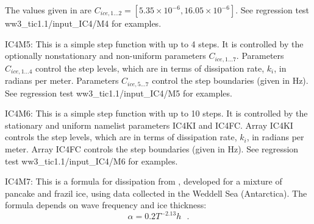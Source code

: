 The values given in \cite{art:Ko14} are ${C_{ice,1...2}}=[5.35\times 10^{-6}, 16.05\times 10^{-6}]$. See regression test {\file ww3\_tic1.1/input\_IC4/M4} for examples.

{\code IC4M5}: This is a simple step function with up to 4 steps. It is controlled by the optionally nonstationary and non-uniform parameters ${C_{ice,1...7}}$. Parameters ${C_{ice,1...4}}$ control the step levels, which are in terms of dissipation rate, ${k_i}$, in radians per meter. Parameters ${C_{ice,5...7}}$ control the step boundaries (given in Hz). See regression test {\file ww3\_tic1.1/input\_IC4/M5} for examples.

{\code IC4M6}: This is a simple step function with up to 10 steps. It is controlled by the stationary and uniform namelist parameters {\code IC4KI} and {\code IC4FC}. Array {\code IC4KI} controls the step levels, which are in terms of dissipation rate, ${k_i}$, in radians per meter. Array {\code IC4FC} controls the step boundaries (given in Hz). See regression test {\file ww3\_tic1.1/input\_IC4/M6} for examples. 

{\code IC4M7}: This is a formula for dissipation from \cite{art:Dob15}, developed for a mixture of pancake and frazil ice, using data collected in the Weddell Sea (Antarctica). The formula depends on wave frequency and ice thickness:
\begin{equation}\label{eq:ice7}
  {\alpha=0.2T^{-2.13}h} \:\:\: .
\end{equation}
